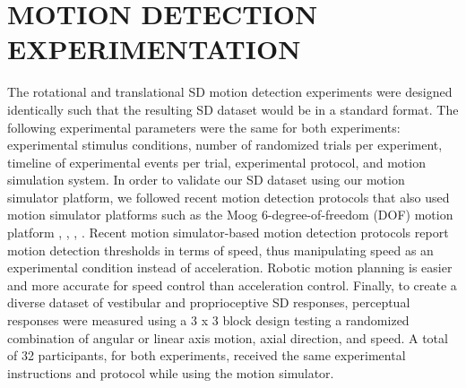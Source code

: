 \section{MOTION DETECTION EXPERIMENTATION}
The rotational and translational SD motion detection experiments were designed identically such that the resulting SD dataset would be in a standard format. The following experimental parameters were the same for both experiments: experimental stimulus conditions, number of randomized trials per experiment, timeline of experimental events per trial, experimental protocol, and motion simulation system. In order to validate our SD dataset using our motion simulator platform, we followed recent motion detection protocols that also used motion simulator platforms such as the Moog 6-degree-of-freedom (DOF) motion platform \cite{BermudezRey_2016_Vestibular}, \cite{Hartmann_2014_Direction}, \cite{Karmali_2017_Multivariate}, \cite{Valko_2012_Vestibular}. Recent motion simulator-based motion detection protocols report motion detection thresholds in terms of speed, thus manipulating speed as an experimental condition instead of acceleration. Robotic motion planning is easier and more accurate for speed control than acceleration control. Finally, to create a diverse dataset of vestibular and proprioceptive SD responses, perceptual responses were measured using a 3 x 3 block design testing a randomized combination of angular or linear axis motion, axial direction, and speed. A total of 32 participants, for both experiments, received the same experimental instructions and protocol while using the motion simulator.

